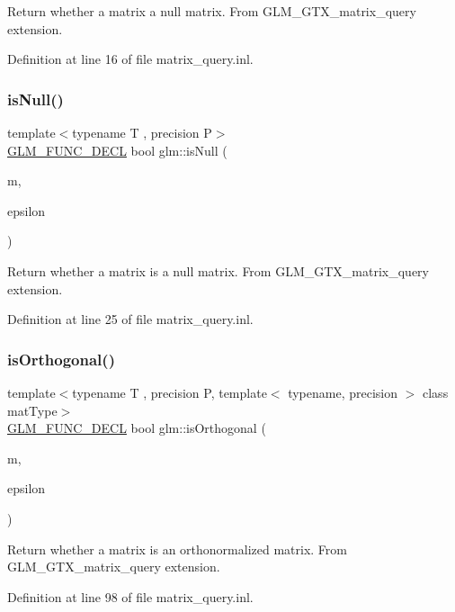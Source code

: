 Return whether a matrix a null matrix. From G\+L\+M\+\_\+\+G\+T\+X\+\_\+matrix\+\_\+query extension. 

Definition at line 16 of file matrix\+\_\+query.\+inl.

\mbox{\label{group__gtx__matrix__query_ga326de496972051413c7b44b85fc9cb6e}} 
\subsubsection{\texorpdfstring{isNull()}{isNull()}\hspace{0.1cm}{\footnotesize\ttfamily [3/3]}}
{\footnotesize\ttfamily template$<$typename T , precision P$>$ \\
\mbox{\hyperlink{setup_8hpp_ab2d052de21a70539923e9bcbf6e83a51}{G\+L\+M\+\_\+\+F\+U\+N\+C\+\_\+\+D\+E\+CL}} bool glm\+::is\+Null (\begin{DoxyParamCaption}\item[{\mbox{\hyperlink{structglm_1_1tmat4x4}{tmat4x4}}$<$ T, P $>$ const \&}]{m,  }\item[{T const \&}]{epsilon }\end{DoxyParamCaption})}

Return whether a matrix is a null matrix. From G\+L\+M\+\_\+\+G\+T\+X\+\_\+matrix\+\_\+query extension. 

Definition at line 25 of file matrix\+\_\+query.\+inl.

\mbox{\label{group__gtx__matrix__query_gab2cb5d23df77b4e4e63ad2965acd31b3}} 
\subsubsection{\texorpdfstring{isOrthogonal()}{isOrthogonal()}}
{\footnotesize\ttfamily template$<$typename T , precision P, template$<$ typename, precision $>$ class mat\+Type$>$ \\
\mbox{\hyperlink{setup_8hpp_ab2d052de21a70539923e9bcbf6e83a51}{G\+L\+M\+\_\+\+F\+U\+N\+C\+\_\+\+D\+E\+CL}} bool glm\+::is\+Orthogonal (\begin{DoxyParamCaption}\item[{mat\+Type$<$ T, P $>$ const \&}]{m,  }\item[{T const \&}]{epsilon }\end{DoxyParamCaption})}

Return whether a matrix is an orthonormalized matrix. From G\+L\+M\+\_\+\+G\+T\+X\+\_\+matrix\+\_\+query extension. 

Definition at line 98 of file matrix\+\_\+query.\+inl.

